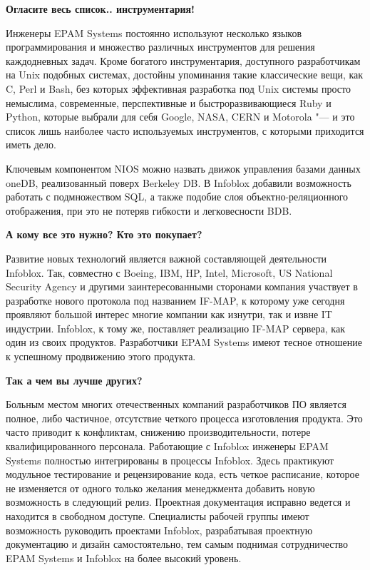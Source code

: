 \documentclass[10pt, a5paper]{article}
\begin{document}
\textbf{Огласите весь список.. инструментария!}

Инженеры EPAM Systems постоянно используют несколько языков программирования и множество 
различных инструментов для решения каждодневных задач. Кроме богатого инструментария, 
доступного разработчикам на Unix подобных системах, достойны упоминания такие 
классические вещи, как C, Perl и Bash, без которых эффективная разработка под Unix системы 
просто немыслима, современные, перспективные и быстроразвивающиеся Ruby и Python, 
которые выбрали для себя Google, NASA, CERN и Motorola "--- и это список лишь наиболее 
часто используемых инструментов, с которыми приходится иметь дело.

Ключевым компонентом NIOS можно назвать движок управления базами данных oneDB, 
реализованный поверх Berkeley DB. В Infoblox добавили возможность работать с 
подмножеством SQL, а также подобие слоя объектно-реляционного отображения, при это не 
потеряв гибкости и легковесности BDB.

\textbf{А кому все это нужно? Кто это покупает?}

Развитие новых технологий является важной составляющей деятельности Infoblox.  Так, 
совместно с Boeing, IBM, HP, Intel, \linebreak Microsoft, US National Security Agency и другими заинтересованными сторонами компания участвует в разработке нового протокола под 
названием IF-MAP, к которому уже сегодня проявляют большой интерес многие компании 
как изнутри, так и извне IT индустрии. Infoblox, к тому же, поставляет реализацию IF-MAP сервера, как один из своих продуктов. Разработчики EPAM Systems имеют тесное отношение к успешному продвижению этого продукта.

\textbf{Так а чем вы лучше других?}

Больным местом многих отечественных компаний разработчиков ПО является полное, либо 
частичное, отсутствие четкого процесса изготовления продукта. Это часто приводит к 
конфликтам, снижению производительности, потере квалифицированного персонала. 
Работающие с Infoblox инженеры EPAM Systems полностью интегрированы в процессы Infoblox. 
Здесь практикуют модульное тестирование и рецензирование кода, есть четкое расписание, 
которое не изменяется от одного только желания менеджмента добавить новую возможность 
в следующий релиз. Проектная документация исправно ведется и находится в свободном 
доступе. Специалисты рабочей группы имеют возможность руководить проектами Infoblox, разрабатывая проектную документацию и дизайн самостоятельно, тем самым поднимая сотрудничество EPAM Systems и Infoblox на более высокий уровень.
\end{document}
